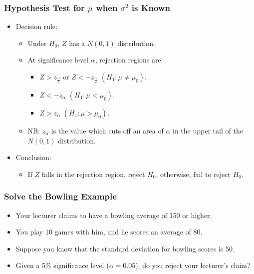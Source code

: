\documentclass[12pt]{beamer}
\begin{document}
\begin{frame}
	\frametitle{Hypothesis Test for $\mu$ when $\sigma^2$ is Known}
	
	\begin{itemize}[label={\color{blue}$\blacktriangleright$}]
		\item Decision rule:
		\begin{itemize}[label={\color{blue}$\blacktriangleright$}]
			\item Under $H_0$, $Z$ has a $N(0,1)$ distribution.
			\item At significance level $\alpha$, rejection regions are:
			\begin{itemize}[label={\color{blue}$\blacktriangleright$}]
				\item $Z > z_{\frac{\alpha}{2}}$ or $Z < -z_{\frac{\alpha}{2}}$ $(H_1 : \mu \neq \mu_0)$.
				\item $Z < -z_{\alpha}$ $(H_1 : \mu < \mu_0)$.
				\item $Z > z_{\alpha}$ $(H_1 : \mu > \mu_0)$.
			\end{itemize}
			\item NB: $z_{\alpha}$ is the value which cuts off an area of $\alpha$ in the upper tail of the $N(0,1)$ distribution.
		\end{itemize}
		
		\item Conclusion:
		\begin{itemize}[label={\color{blue}$\blacktriangleright$}]
			\item If $Z$ falls in the rejection region, reject $H_0$, otherwise, fail to reject $H_0$.
		\end{itemize}
	\end{itemize}
	
\end{frame}
\begin{frame}
	\frametitle{Solve the Bowling Example}
	
	\begin{itemize}[label={\color{blue}$\blacktriangleright$}]
		\item Your lecturer claims to have a bowling average of 150 or higher.
		
		\item You play 10 games with him, and he scores an average of 80.
		
		\item Suppose you know that the standard deviation for bowling scores is 50.
		
		\item Given a 5\% significance level ($\alpha = 0.05$), do you reject your lecturer's claim?
	\end{itemize}
	
\end{frame}
\end{document}
